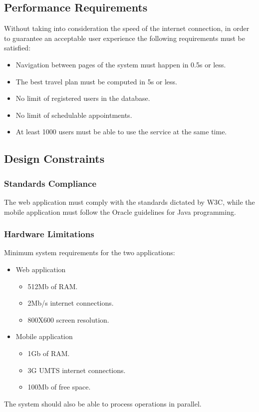 \subsection{Performance Requirements}
Without taking into consideration the speed of the internet connection, in order to guarantee an acceptable user experience the following  requirements must be satisfied:
\begin{itemize}
\item Navigation between pages of the system must happen in 0.5s or less.
\item The  best travel plan must be computed in 5s or less.
\item No limit of registered users in the database.
\item No limit of schedulable appointments.
\item At least 1000 users must be able to use the service at the same time. 
\end{itemize}
\newpage
\subsection{Design Constraints}
\subsubsection{Standards Compliance}
The web application must comply with the standards dictated by W3C, while the mobile application must follow the Oracle guidelines for Java programming.
\subsubsection{Hardware Limitations}
\label{sec:HardwareLimitations}
Minimum system requirements for the two applications:
\begin{itemize}
\item Web application
\begin{itemize}
\item 512Mb of RAM.
\item 2Mb/s internet connections.
\item 800X600 screen resolution.
\end{itemize}
\item Mobile application
\begin{itemize}
\item 1Gb of RAM.
\item 3G UMTS internet connections.
\item 100Mb of free space.
\end{itemize}
\end{itemize}
The system should also be able to process operations in parallel.
\clearpage
